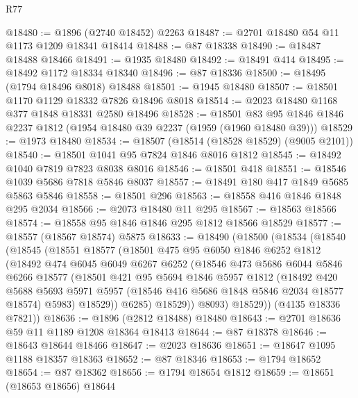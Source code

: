 \begin{lexlean}{R77}
\begin{coremodule}
@18480 := @1896 (@2740 @18452) @2263
@18487 := @2701 @18480 @54 @11 @1173 @1209 @18341 @18414
@18488 := @87 @18338
@18490 := @18487 @18488 @18466
@18491 := @1935 @18480
@18492 := @18491 @414
@18495 := @18492 @1172 @18334 @18340
@18496 := @87 @18336
@18500 := @18495 (@1794 @18496 @8018) @18488
@18501 := @1945 @18480
@18507 := @18501 @1170 @1129 @18332 @7826 @18496 @8018
@18514 := @2023 @18480 @1168 @377 @1848 @18331 @2580 @18496
@18528 := @18501 @83 @95 @1846 @1846 @2237 @1812 (@1954 @18480 @39 @2237 (@1959 (@1960 @18480 @39)))
@18529 := @1973 @18480
@18534 := @18507 (@18514 (@18528 @18529) (@9005 @2101))
@18540 := @18501 @1041 @95 @7824 @1846 @8016 @1812
@18545 := @18492 @1040 @7819 @7823 @8038 @8016
@18546 := @18501 @418
@18551 := @18546 @1039 @5686 @7818 @5846 @8037
@18557 := @18491 @180 @417 @1849 @5685 @5863 @5846
@18558 := @18501 @296
@18563 := @18558 @416 @1846 @1848 @295 @2034
@18566 := @2073 @18480 @11 @295
@18567 := @18563 @18566
@18574 := @18558 @95 @1846 @1846 @295 @1812 @18566 @18529
@18577 := @18557 (@18567 @18574) @5875
@18633 := @18490
    (@18500
      (@18534
        (@18540
          (@18545
            (@18551
              @18577
              (@18501
                @475
                @95
                @6050
                @1846
                @6252
                @1812
                (@18492
                  @474
                  @6045
                  @6049
                  @6267
                  @6252
                  (@18546
                    @473
                    @5686
                    @6044
                    @5846
                    @6266
                    @18577
                    (@18501
                      @421
                      @95
                      @5694
                      @1846
                      @5957
                      @1812
                      (@18492
                        @420
                        @5688
                        @5693
                        @5971
                        @5957
                        (@18546 @416 @5686 @1848 @5846 @2034 @18577 @18574)
                        @5983)
                      @18529))
                  @6285)
                @18529))
            @8093)
          @18529))
      (@4135 @18336 @7821))
@18636 := @1896 (@2812 @18488) @18480
@18643 := @2701 @18636 @59 @11 @1189 @1208 @18364 @18413
@18644 := @87 @18378
@18646 := @18643 @18644 @18466
@18647 := @2023 @18636
@18651 := @18647 @1095 @1188 @18357 @18363
@18652 := @87 @18346
@18653 := @1794 @18652
@18654 := @87 @18362
@18656 := @1794 @18654 @1812
@18659 := @18651 (@18653 @18656) @18644

\end{coremodule}
\end{lexlean}
